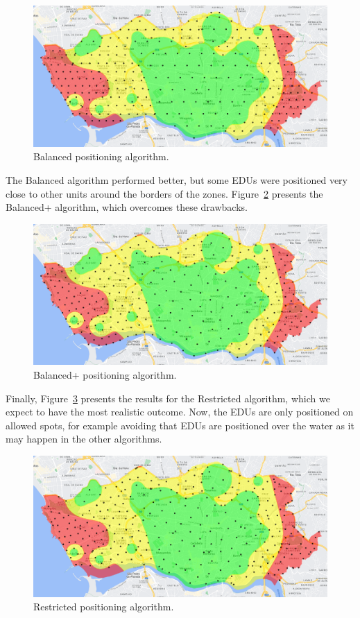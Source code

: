 \begin{refsection}
\begin{figure}[htbp!]
    \centering
    \includegraphics[width=0.9\linewidth]{Chapters/2-EDUs/images/porto_M3_balanced.png}
    \caption{Balanced positioning algorithm.}
    \label{Fig:edus_balanced}
\end{figure}

The Balanced algorithm performed better, but some EDUs were positioned very close to other units around the borders of the zones. Figure~\ref{Fig:edus_enhanced} presents the Balanced+ algorithm, which overcomes these drawbacks.

\begin{figure}[htbp!]
    \centering
    \includegraphics[width=0.9\linewidth]{Chapters/2-EDUs/images/porto_M3_balanced_plus.png}
    \caption{Balanced+ positioning algorithm.}
    \label{Fig:edus_enhanced}
\end{figure}

Finally, Figure~\ref{Fig:edus_restricted} presents the results for the Restricted algorithm, which we expect to have the most realistic outcome. Now, the EDUs are only positioned on allowed spots, for example avoiding that EDUs are positioned over the water as it may happen in the other algorithms.  

\begin{figure}[htbp!]
    \centering
    \includegraphics[width=0.9\linewidth]{Chapters/2-EDUs/images/porto_M3_restricted.png}
    \caption{Restricted positioning algorithm.}
    \label{Fig:edus_restricted}
\end{figure}


\end{refsection}
